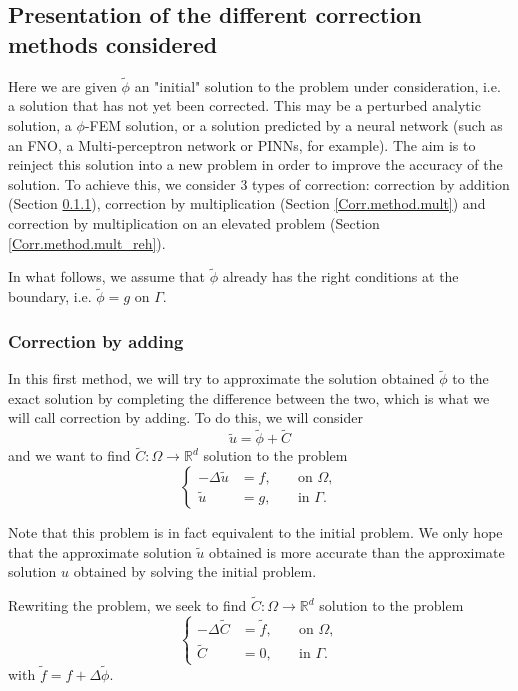 \subsection{Presentation of the different correction methods considered} \label{Corr.methods}

Here we are given $\tilde{\phi}$ an "initial" solution to the problem under consideration, i.e. a solution that has not yet been corrected. This may be a perturbed analytic solution, a $\phi$-FEM solution, or a solution predicted by a neural network (such as an FNO, a Multi-perceptron network or PINNs, for example). The aim is to reinject this solution into a new problem in order to improve the accuracy of the solution. To achieve this, we consider 3 types of correction: correction by addition (Section \ref{Corr.method.add}), correction by multiplication (Section \ref{Corr.method.mult}) and correction by multiplication on an elevated problem (Section \ref{Corr.method.mult_reh}).

\begin{Rem}
	In what follows, we assume that $\tilde{\phi}$ already has the right conditions at the boundary, i.e. $\tilde{\phi}=g$ on $\Gamma$.
\end{Rem}

\subsubsection{Correction by adding} \label{Corr.method.add}

In this first method, we will try to approximate the solution obtained $\tilde{\phi}$ to the exact solution by completing the difference between the two, which is what we will call correction by adding. To do this, we will consider
\begin{equation*}
	\tilde{u}=\tilde{\phi}+\tilde{C}
\end{equation*}
and we want to find $\tilde{C}: \Omega \rightarrow \mathbb{R}^d$ solution to the problem
\begin{equation*}
	\left\{\begin{aligned}
		-\Delta \tilde{u}&=f, \; &&\text{on } \Omega, \\
		\tilde{u}&=g, \; &&\text{in } \Gamma.
	\end{aligned}\right.
\end{equation*}
\begin{Rem}
	Note that this problem is in fact equivalent to the initial problem. We only hope that the approximate solution $\tilde{u}$ obtained is more accurate than the approximate solution $u$ obtained by solving the initial problem.
\end{Rem}
Rewriting the problem, we seek to find $\tilde{C}: \Omega \rightarrow \mathbb{R}^d$ solution to the problem
\begin{equation*}
\left\{\begin{aligned}
	-\Delta \tilde{C}&=\tilde{f}, \; &&\text{on } \Omega, \\
	\tilde{C}&=0, \; &&\text{in } \Gamma.
\end{aligned}\right. %
\end{equation*}
with $\tilde{f}=f+\Delta\tilde{\phi}$.

